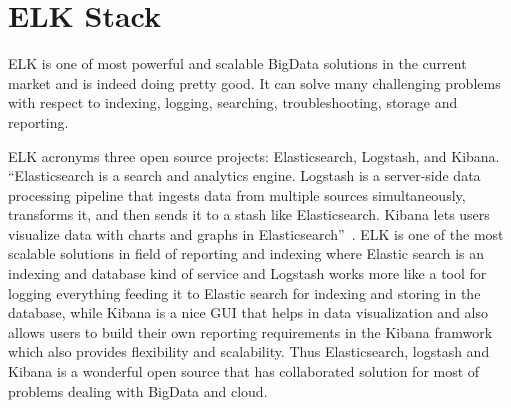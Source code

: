 \section{ELK Stack}

ELK is one of most powerful and scalable BigData solutions in the current
market and is indeed doing pretty good. It can solve many challenging 
problems with respect to indexing, logging, searching, troubleshooting,
storage and reporting.

ELK acronyms three open source projects: Elasticsearch, Logstash, 
and Kibana. ``Elasticsearch is a search and analytics engine. Logstash is a 
server‑side data processing pipeline that ingests data from multiple sources 
simultaneously, transforms it, and then sends it to a stash like 
Elasticsearch. Kibana lets users visualize data with charts and graphs in 
Elasticsearch''~\cite{hid-sp18-410-ELKBlog}. ELK is one of the most scalable solutions in
field of reporting and indexing where Elastic search is an indexing and
database kind of service and Logstash works more like a tool for logging
everything feeding it to Elastic search for indexing and storing in 
the database, while Kibana is a nice GUI that helps in data visualization
and also allows users to build their own reporting requirements in the
Kibana framwork which also provides flexibility and scalability.
Thus Elasticsearch, logstash and Kibana is a wonderful open source that
has collaborated solution for most of problems dealing with BigData 
and cloud.

